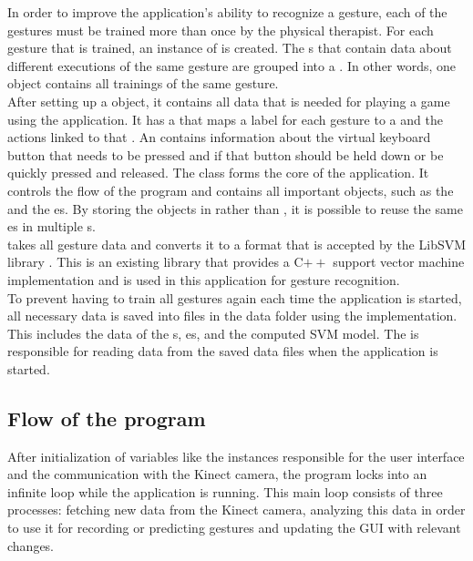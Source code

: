 In order to improve the application's ability to recognize a gesture, each of the gestures must be trained more than once by the physical therapist. For each gesture that is trained, an instance of  is created. The s that contain data about different executions of the same gesture are grouped into a . In other words, one  object contains all trainings of the same gesture.\\

After setting up a  object, it contains all data that is needed for playing a game using the application. It has a  that maps a label for each gesture to a  and the actions linked to that . An  contains information about the virtual keyboard button that needs to be pressed and if that button should be held down or be quickly pressed and released. The  class forms the core of the application. It controls the flow of the program and contains all important objects, such as the  and the es. By storing the  objects in  rather than , it is possible to reuse the same es in multiple s.\\

 takes all gesture data and converts it to a format that is accepted by the LibSVM library \cite{LibSVM}. This is an existing library that provides a C$++$ support vector machine implementation and is used in this application for gesture recognition.\\

To prevent having to train all gestures again each time the application is started, all necessary data is saved into files in the data folder using the  implementation. This includes the data of the s, es,  and the computed SVM model. The  is responsible for reading data from the saved data files when the application is started.\\


\subsection{Flow of the program}

After initialization of variables like the instances responsible for the user interface and the communication with the Kinect camera, the program locks into an infinite loop while the application is running. This main loop consists of three processes: fetching new data from the Kinect camera, analyzing this data in order to use it for recording or predicting gestures and updating the GUI with relevant changes.\\

